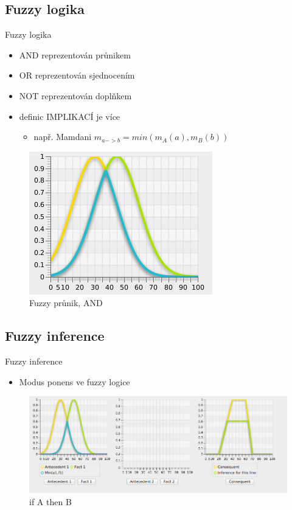 \documentclass{beamer}
\begin{document}
\subsection{Fuzzy logika}
\begin{frame}{Fuzzy logika}
	
	\begin{itemize}
		\item AND reprezentován průnikem
		\item OR reprezentován sjednocením
		\item NOT reprezentován doplňkem
		\item definic IMPLIKACÍ je více
			\begin{itemize}
				\item např. Mamdani \(m_{a->b} = min(m_{A}(a),m_{B}(b))\)
			\end{itemize}
	\end{itemize}
	
	\begin{figure}[h]
		\centering
		\includegraphics[scale=0.4]{fuzzyIntersection}
		\caption{Fuzzy průnik, AND}
	\end{figure}
	
\end{frame}

\subsection{Fuzzy inference}
\begin{frame}{Fuzzy inference}
	
	\begin{itemize}
		\item Modus ponens ve fuzzy logice
	\end{itemize}
	
	\begin{figure}[h]
		\centering
		\includegraphics[scale=0.3]{oneRuleSimpleDetail}
		\caption{if A then B}
	\end{figure}
	
\end{frame}
\end{document}
